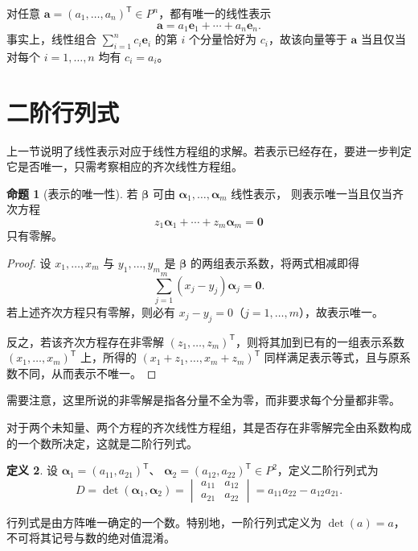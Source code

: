\documentclass[UTF8, fontset=fandol, a4paper, 12pt]{ctexart}
\theoremstyle{definition}
\newtheorem{definition}{定义}[section]
\newtheorem{proposition}[definition]{命题}
\begin{document}
对任意 $\boldsymbol a=(a_1,\ldots,a_n)^{\mathsf T}\in P^n$，都有唯一的线性表示
\[
\boldsymbol a=a_1\boldsymbol e_1+\cdots+a_n\boldsymbol e_n.
\]
事实上，线性组合 $\sum_{i=1}^n c_i\boldsymbol e_i$ 的第 $i$ 个分量恰好为 $c_i$，故该向量等于 $\boldsymbol a$ 当且仅当对每个 $i=1,\ldots,n$ 均有 $c_i=a_i$。

\section{二阶行列式}

上一节说明了线性表示对应于线性方程组的求解。若表示已经存在，要进一步判定它是否唯一，只需考察相应的齐次线性方程组。

\begin{proposition}[表示的唯一性]
若 $\boldsymbol\beta$ 可由 $\boldsymbol\alpha_1,\ldots,\boldsymbol\alpha_m$ 线性表示，
则表示唯一当且仅当齐次方程
\[
z_1\boldsymbol\alpha_1+\cdots+z_m\boldsymbol\alpha_m=\boldsymbol0
\]
只有零解。
\end{proposition}
\begin{proof}
设 $x_1,\ldots,x_m$ 与 $y_1,\ldots,y_m$ 是 $\boldsymbol\beta$ 的两组表示系数，将两式相减即得
\[
\sum_{j=1}^m(x_j-y_j)\boldsymbol\alpha_j=\boldsymbol0.
\]
若上述齐次方程只有零解，则必有 $x_j-y_j=0$（$j=1,\ldots,m$），故表示唯一。

反之，若该齐次方程存在非零解 $(z_1,\ldots,z_m)^{\mathsf T}$，则将其加到已有的一组表示系数 $(x_1,\ldots,x_m)^{\mathsf T}$ 上，所得的 $(x_1+z_1,\ldots,x_m+z_m)^{\mathsf T}$ 同样满足表示等式，且与原系数不同，从而表示不唯一。
\end{proof}

需要注意，这里所说的非零解是指各分量不全为零，而非要求每个分量都非零。

对于两个未知量、两个方程的齐次线性方程组，其是否存在非零解完全由系数构成的一个数所决定，这就是二阶行列式。

\begin{definition}
设 $\boldsymbol\alpha_1=(a_{11},a_{21})^{\mathsf T}$、
$\boldsymbol\alpha_2=(a_{12},a_{22})^{\mathsf T}\in P^2$，定义二阶行列式为
\[
D=\det(\boldsymbol\alpha_1,\boldsymbol\alpha_2)
=\begin{vmatrix}a_{11}&a_{12}\\a_{21}&a_{22}\end{vmatrix}
=a_{11}a_{22}-a_{12}a_{21}.
\]
\end{definition}

行列式是由方阵唯一确定的一个数。特别地，一阶行列式定义为 $\det(a)=a$，不可将其记号与数的绝对值混淆。
\end{document}

